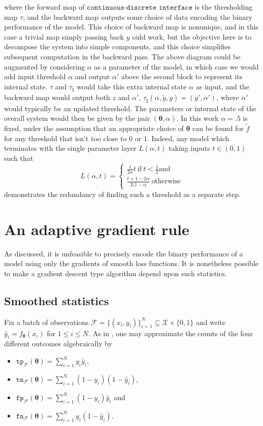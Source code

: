 \documentclass[10pt,a4paper]{article}
\begin{document}
where the forward map of $\texttt{continuous-discrete interface}$ is the thresholding map $\tau$, and the backward map outputs some choice of data encoding the binary performance of the model.
This choice of backward map is nonunique, and in this case a trivial map simply passing back $y$ ould work, but the objective here is to decompose the system into simple components, and this choice simplifies subsequent computation in the backward pass.
The above diagram could be augmented by considering $\alpha$ as a parameter of the model, in which case we would add input threshold $\alpha$ and output $\alpha'$ above the second block to represent its internal state.
$\tau$ and $\tau_\sharp$ would take this extra internal state $\alpha$ as input, and the backward map would output both $z$ and $\alpha'$, $\tau_\sharp(\alpha,\tilde y,y)=(y',\alpha')$, where $\alpha'$ would typically be an updated threshold.
The parameters or internal state of the overall system would then be given by the pair $(\boldsymbol\theta,\alpha)$.
In this work $\alpha=.5$ is fixed, under the assumption that an appropriate choice of $\boldsymbol\theta$ can be found for $\tilde f$ for any threshold that isn't too close to $0$ or $1$.
Indeed, any model which terminates with the single parameter layer $L(\alpha,t)$ taking inputs $t\in(0,1)$ such that
$$
L(\alpha,t)=\begin{cases}\tfrac1{2\alpha}t~\text{if}~t<\tfrac12\text{and}\\\tfrac{t+1-2\alpha}{2(1-\alpha}~\text{otherwise}\end{cases}
$$
demonstrates the redundancy of finding such a threshold as a separate step.
\section{An adaptive gradient rule}

As discussed, it is unfeasible to precisely encode the binary performance of a model using only the gradients of smooth loss functions.
It is nonetheless possible to make a gradient descent type algorithm depend upon such statistics.

\subsection{Smoothed statistics}

Fix a batch of observations $\mathcal F=\{(x_i,y_i)\}_{i=1}^N\subseteq\mathcal X\times\{0,1\}$ and write $\hat y_i=f_{\boldsymbol\theta}(x_i)$ for $1\leq i\leq N$.
As in \cite{lee2021surrogate}, one may  approximate the counts of the four different outcomes algebraically by
\begin{itemize}
  \item $\texttt{tp}_\mathcal F(\boldsymbol\theta)=\sum_{i=1}^N y_i\hat y_i$,
  \item $\texttt{tn}_\mathcal F(\boldsymbol\theta)=\sum_{i=1}^N(1-y_i)(1-\hat y_i)$,
  \item $\texttt{fp}_\mathcal F(\boldsymbol\theta)=\sum_{i=1}^N(1-y_i)\hat y_i$ and
  \item $\texttt{fn}_\mathcal F(\boldsymbol\theta)=\sum_{i=1}^Ny_i(1-\hat y_i)$.
\end{itemize}
\end{document}
